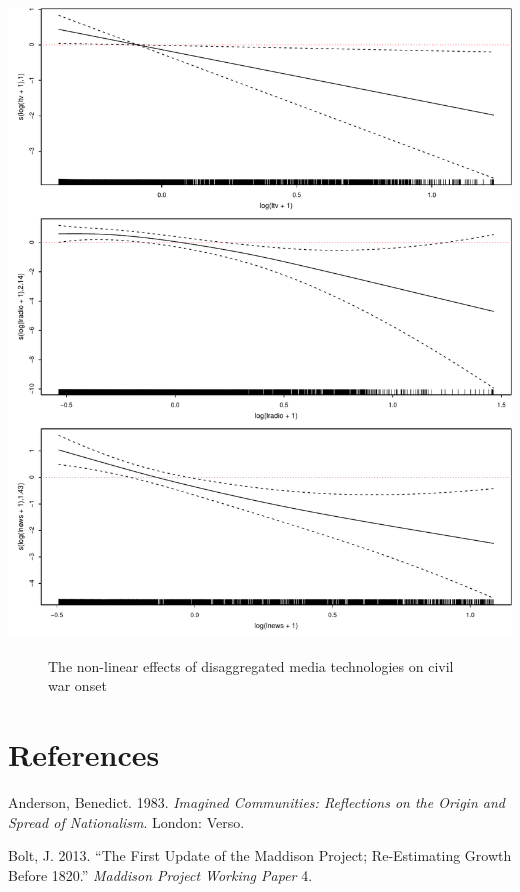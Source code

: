 \documentclass[11pt,article,oneside]{memoir}
\makeatletter
\def\maxwidth{\ifdim\Gin@nat@width>\linewidth\linewidth
\else\Gin@nat@width\fi}
\let\Oldincludegraphics\includegraphics
\renewcommand{\includegraphics}[1]{\Oldincludegraphics[width=\maxwidth]{#1}}
\makeatother
\begin{document}
\clearpage
\includegraphics{./media_civil_war_files/figure-markdown/disaggregated-nonlinear.pdf}

\begin{figure}
\caption{The non-linear effects of disaggregated media technologies on civil war onset}  
\end{figure}

\pagebreak   

\section{References}\label{references}

\setlength{\parindent}{-0.2in} \setlength{\leftskip}{0.2in}
\setlength{\parskip}{8pt} \vspace*{-0.2in} \noindent

Anderson, Benedict. 1983. \emph{Imagined Communities: Reflections on the
Origin and Spread of Nationalism}. London: Verso.

Bolt, J. 2013. ``The First Update of the Maddison Project; Re-Estimating
Growth Before 1820.'' \emph{Maddison Project Working Paper} 4.
\end{document}
